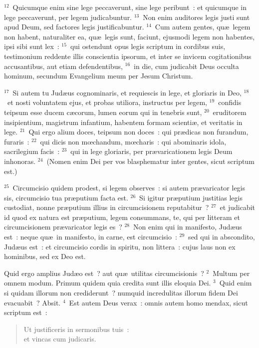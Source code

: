 ${}^{12}$~Quicumque enim sine lege peccaverunt, sine lege peribunt~: et quicumque in lege peccaverunt, per legem judicabuntur.
${}^{13}$~Non enim auditores legis justi sunt apud Deum, sed factores legis justificabuntur.
${}^{14}$~Cum autem gentes, qu\ae\ legem non habent, naturaliter ea, qu\ae\ legis sunt, faciunt, ejusmodi legem non habentes, ipsi sibi sunt lex~:
${}^{15}$~qui ostendunt opus legis scriptum in cordibus suis, testimonium reddente illis conscientia ipsorum, et inter se invicem cogitationibus accusantibus, aut etiam defendentibus,
${}^{16}$~in die, cum judicabit Deus occulta hominum, secundum Evangelium meum per Jesum Christum.


${}^{17}$~Si autem tu Jud\ae us cognominaris, et requiescis in lege, et gloriaris in Deo,
${}^{18}$~et nosti voluntatem ejus, et probas utiliora, instructus per legem,
${}^{19}$~confidis teipsum esse ducem c\ae corum, lumen eorum qui in tenebris sunt,
${}^{20}$~eruditorem insipientium, magistrum infantium, habentem formam scienti\ae , et veritatis in lege.
${}^{21}$~Qui ergo alium doces, teipsum non doces~: qui pr\ae dicas non furandum, furaris~:
${}^{22}$~qui dicis non mœchandum, mœcharis~: qui abominaris idola, sacrilegium facis~:
${}^{23}$~qui in lege gloriaris, per pr\ae varicationem legis Deum inhonoras.
${}^{24}$~(Nomen enim Dei per vos blasphematur inter gentes, sicut scriptum est.)


${}^{25}$~Circumcisio quidem prodest, si legem observes~: si autem pr\ae varicator legis sis, circumcisio tua pr\ae putium facta est.
${}^{26}$~Si igitur pr\ae putium justitias legis custodiat, nonne pr\ae putium illius in circumcisionem reputabitur~?
${}^{27}$~et judicabit id quod ex natura est pr\ae putium, legem consummans, te, qui per litteram et circumcisionem pr\ae varicator legis es~?
${}^{28}$~Non enim qui in manifesto, Jud\ae us est~: neque qu\ae\ in manifesto, in carne, est circumcisio~:
${}^{29}$~sed qui in abscondito, Jud\ae us est~: et circumcisio cordis in spiritu, non littera~: cujus laus non ex hominibus, sed ex Deo est.

\lettrine[lines=10,image=true,loversize=0.05,lraise=-0.03]{Q}{}uid ergo amplius Jud\ae o est~? aut qu\ae\ utilitas circumcisionis~?
${}^{2}$~Multum per omnem modum. Primum quidem quia credita sunt illis eloquia Dei.
${}^{3}$~Quid enim si quidam illorum non crediderunt~? numquid incredulitas illorum fidem Dei evacuabit~? Absit.
${}^{4}$~Est autem Deus verax~: omnis autem homo mendax, sicut scriptum est~: \begin{flushleft}\begin{verse}Ut justificeris in sermonibus tuis~:\\ et vincas cum judicaris.\end{verse}\end{flushleft}


